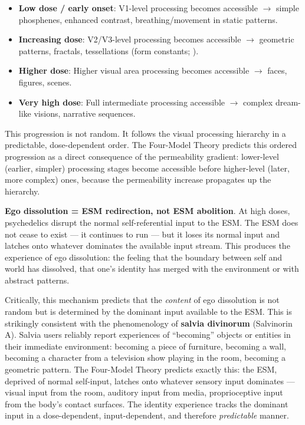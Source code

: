 \documentclass[12pt]{article}
\begin{document}
\begin{itemize}
\item \textbf{Low dose / early onset}: V1-level processing becomes accessible $\rightarrow$ simple phosphenes, enhanced contrast, breathing/movement in static patterns.
\item \textbf{Increasing dose}: V2/V3-level processing becomes accessible $\rightarrow$ geometric patterns, fractals, tessellations (form constants; \citealp{Kluver1966}).
\item \textbf{Higher dose}: Higher visual area processing becomes accessible $\rightarrow$ faces, figures, scenes.
\item \textbf{Very high dose}: Full intermediate processing accessible $\rightarrow$ complex dream-like visions, narrative sequences.
\end{itemize}

This progression is not random. It follows the visual processing hierarchy in a predictable, dose-dependent order. The Four-Model Theory predicts this ordered progression as a direct consequence of the permeability gradient: lower-level (earlier, simpler) processing stages become accessible before higher-level (later, more complex) ones, because the permeability increase propagates up the hierarchy.

\textbf{Ego dissolution = ESM redirection, not ESM abolition}. At high doses, psychedelics disrupt the normal self-referential input to the ESM. The ESM does not cease to exist --- it continues to run --- but it loses its normal input and latches onto whatever dominates the available input stream. This produces the experience of ego dissolution: the feeling that the boundary between self and world has dissolved, that one's identity has merged with the environment or with abstract patterns.

Critically, this mechanism predicts that the \emph{content} of ego dissolution is not random but is determined by the dominant input available to the ESM. This is strikingly consistent with the phenomenology of \textbf{salvia divinorum} (Salvinorin A). Salvia users reliably report experiences of ``becoming'' objects or entities in their immediate environment: becoming a piece of furniture, becoming a wall, becoming a character from a television show playing in the room, becoming a geometric pattern. The Four-Model Theory predicts exactly this: the ESM, deprived of normal self-input, latches onto whatever sensory input dominates --- visual input from the room, auditory input from media, proprioceptive input from the body's contact surfaces. The identity experience tracks the dominant input in a dose-dependent, input-dependent, and therefore \emph{predictable} manner.
\end{document}

